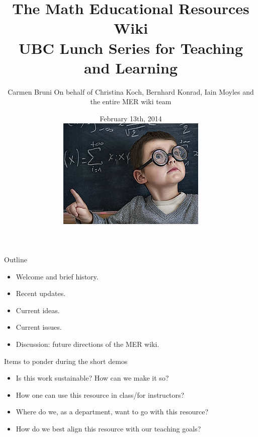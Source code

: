 \documentclass{beamer}
\title[The Math Exam Resource Wiki]{The Math \xcancel{Exam} Educational Resources Wiki \\ UBC Lunch Series for Teaching and Learning}
\author{Carmen Bruni
\newline
On behalf of Christina Koch, Bernhard Konrad, Iain Moyles and the entire MER wiki team}
\institute{University of British Columbia}
\date{February 13th, 2014 \\
\includegraphics[scale=0.4]{Math_kid.jpg}
}
\begin{document}
\frame{\titlepage}






\frame
{
  \begin{block}{Outline}

      \begin{itemize}
				\item Welcome and brief history.
                \item Recent updates.
				\item Current ideas.
                \item Current issues.
				\item Discussion: future directions of the MER wiki.
      \end{itemize}
  \end{block}

  \begin{block}{Items to ponder during the short demos}

      \begin{itemize}
				\item Is this work sustainable? How can we make it so?
				\item How one can use this resource in class/for instructors?
				\item Where do we, as a department, want to go with this resource?
                \item How do we best align this resource with our teaching goals?
      \end{itemize}
  \end{block}

}
\end{document}

